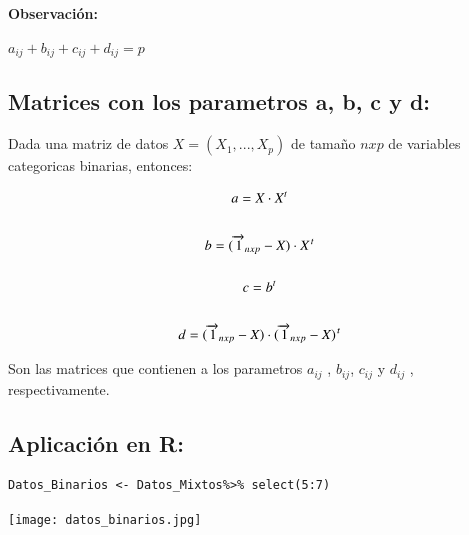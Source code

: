 \documentclass[12pt]{report} %
\begin{document}
\vspace{0.2cm}
\textbf{Observación:}

$a_{ij} + b_{ij} + c_{ij} +d_{ij} =p$

\subsection{Matrices con los parametros a, b, c y d:}


Dada una matriz de datos $X=(X_1,...,X_p)$ de tamaño $nxp$ de variables categoricas binarias, entonces:

\begin{tcolorbox}[toptitle=2mm,title=  Matrices con los parametros  :   ]
\begin{gather*}
a=X\cdot X^t  \\ \\
b=(\overrightarrow{1}_{nxp} - X)\cdot X\hspace{0.03cm}^t \\ \\
c=b^t \\ \\
d=(\overrightarrow{1}_{nxp} - X)\cdot(\overrightarrow{1}_{nxp} - X)\hspace{0.03cm}^t
\end{gather*} 
 
\end{tcolorbox} 
 
Son las matrices que contienen a los parametros $a_{ij}$ \hspace{0.1cm},\hspace{0.1cm} $b_{ij}$\hspace{0.1cm},\hspace{0.1cm} $c_{ij}$ \hspace{0.1cm}y\hspace{0.1cm} $d_{ij}$ , respectivamente.

\newpage

\subsection{Aplicación en R:}

\begin{lstlisting}
Datos_Binarios <- Datos_Mixtos%>% select(5:7)
\end{lstlisting}

\texttt{[image: datos\_binarios.jpg]}

\vspace{0.4cm}
\end{document}
